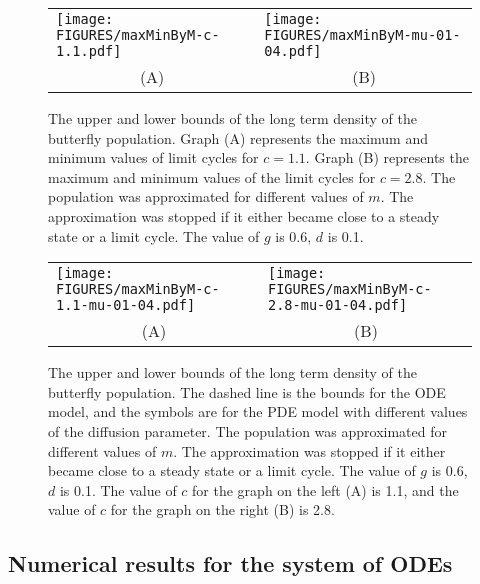 \documentclass[review,authoryear]{elsarticle}
\begin{document}
\begin{figure}[htb]
  \begin{tabular}{p{}p{}}
  \texttt{[image: FIGURES/maxMinByM-c-1.1.pdf]} 
  &
  \texttt{[image: FIGURES/maxMinByM-mu-01-04.pdf]} \\
  \multicolumn{1}{c}{(A)} & 
  \multicolumn{1}{c}{(B)} \\
  \end{tabular}
  \caption[Upper and lower bounds of the butterfly density.]{The upper
    and lower bounds of the long term density of the butterfly
    population. Graph (A) represents the maximum and minimum values of limit cycles for $c=1.1$. Graph (B) represents the maximum and minimum values of the limit cycles for $c=2.8$. The population was approximated for different values
    of $m$. The approximation was stopped if it either became close to
    a steady state or a limit cycle.  The value of $g$ is 0.6, $d$ is 0.1. }
  \label{fig:odeButterflyMaxMin}
\end{figure}

\begin{figure}[htb]
  \begin{tabular}{p{}p{}}
  \texttt{[image: FIGURES/maxMinByM-c-1.1-mu-01-04.pdf]} 
  &
  \texttt{[image: FIGURES/maxMinByM-c-2.8-mu-01-04.pdf]} \\
  \multicolumn{1}{c}{(A)} & 
  \multicolumn{1}{c}{(B)} \\
  \end{tabular}
  \caption[Upper and lower bounds of the butterfly density.]{The  upper
    and lower bounds of the long term density of the butterfly
    population. The dashed line is the bounds for the ODE model, and the symbols are for the PDE model with different values of the diffusion parameter. The population was approximated for different values
    of $m$. The approximation was stopped if it either became close to
    a steady state or a limit cycle.  The value of $g$ is 0.6, $d$ is 0.1. The value of $c$ for the graph on the left (A) is 1.1, and the value of $c$ for the graph on the right (B) is 2.8.}
  \label{fig:odepdeButterflyMaxMin}
\end{figure}






\subsection{Numerical results for the system of ODEs}
\label{subsection:odeApproximation}
\end{document}
